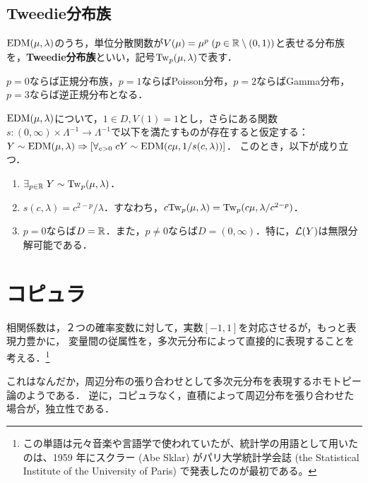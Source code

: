 \documentclass[uplatex,dvipdfmx]{jsreport}
\begin{document}
\subsection{Tweedie分布族}

\begin{definition}
    $\mathrm{EDM}(\mu,\lambda)$のうち，単位分散関数が$V(\mu)=\mu^p\;(p\in\mathbb{R}\setminus(0,1))$と表せる分布族を，\textbf{Tweedie分布族}といい，記号$\mathrm{Tw}_p(\mu,\lambda)$で表す．
\end{definition}
\begin{example}
    $p=0$ならば正規分布族，$p=1$ならばPoisson分布，$p=2$ならばGamma分布，$p=3$ならば逆正規分布となる．
\end{example}

\begin{proposition}
    $\mathrm{EDM}(\mu,\lambda)$について，$1\in D,V(1)=1$とし，さらにある関数$s:(0,\infty)\times\Lambda^{-1}\to\Lambda^{-1}$で以下を満たすものが存在すると仮定する：$Y\sim\mathrm{EDM}(\mu,\lambda)\Rightarrow[\forall_{c>0}\;cY\sim\mathrm{EDM}(c\mu,1/s(c,\lambda))]$．
    このとき，以下が成り立つ．
    \begin{enumerate}
        \item $\exists_{p\in\mathbb{R}}\;Y\sim\mathrm{Tw}_p(\mu,\lambda)$．
        \item $s(c,\lambda)=c^{2-p}/\lambda$．すなわち，$c\mathrm{Tw}_p(\mu,\lambda)=\mathrm{Tw}_p(c\mu,\lambda/c^{2-p})$．
        \item $p=0$ならば$D=\mathbb{R}$．また，$p\ne0$ならば$D=(0,\infty)$．特に，$\mathcal{L}(Y)$は無限分解可能である．
    \end{enumerate}
\end{proposition}

\section{コピュラ}

\begin{tcolorbox}[colframe=ForestGreen, colback=ForestGreen!10!white,breakable,colbacktitle=ForestGreen!40!white,coltitle=black,fonttitle=\bfseries\sffamily,
title=]
    相関係数は，２つの確率変数に対して，実数$[-1,1]$を対応させるが，もっと表現力豊かに，
    変量間の従属性を，多次元分布によって直接的に表現することを考える．\footnote{この単語は元々音楽や言語学で使われていたが、統計学の用語として用いたのは、1959 年にスクラー (Abe Sklar) がパリ大学統計学会誌 (the Statistical Institute of the University of Paris) で発表したのが最初である。}

    これはなんだか，周辺分布の張り合わせとして多次元分布を表現するホモトピー論のようである．
    逆に，コピュラなく，直積によって周辺分布を張り合わせた場合が，独立性である．
\end{tcolorbox}
\end{document}
